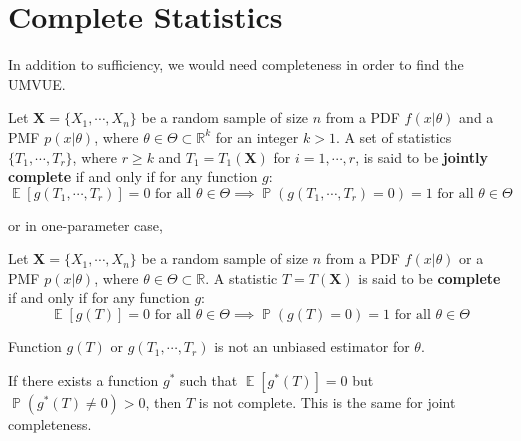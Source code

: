 \documentclass{huhtakm-template-book-v2}
\DeclareMathOperator{\prob}{\mathbb{P}}
\DeclareMathOperator{\E}{\mathbb{E}}
\begin{document}
\section{Complete Statistics}
In addition to sufficiency, we would need completeness in order to find the UMVUE.
\begin{defn}
	Let $\mathbf{X}=\{X_{1},\cdots,X_{n}\}$ be a random sample of size $n$ from a PDF $f(x|\theta)$ and a PMF $p(x|\theta)$, where $\theta\in\Theta\subset\mathbb{R}^{k}$ for an integer $k>1$. A set of statistics $\{T_{1},\cdots,T_{r}\}$, where $r\geq k$ and $T_{1}=T_{1}(\mathbf{X})$ for $i=1,\cdots,r$, is said to be \textbf{jointly complete} if and only if for any function $g$:
	\begin{equation*}
		\E[g(T_{1},\cdots,T_{r})]=0\text{ for all }\theta\in\Theta\implies\prob(g(T_{1},\cdots,T_{r})=0)=1\text{ for all }\theta\in\Theta
	\end{equation*}
\end{defn}
or in one-parameter case,
\begin{defn}
	Let $\mathbf{X}=\{X_{1},\cdots,X_{n}\}$ be a random sample of size $n$ from a PDF $f(x|\theta)$ or a PMF $p(x|\theta)$, where $\theta\in\Theta\subset\mathbb{R}$. A statistic $T=T(\mathbf{X})$ is said to be \textbf{complete} if and only if for any function $g$:
	\begin{equation*}
		\E[g(T)]=0\text{ for all }\theta\in\Theta\implies\prob(g(T)=0)=1\text{ for all }\theta\in\Theta
	\end{equation*} 
\end{defn}
\begin{rem}
	Function $g(T)$ or $g(T_{1},\cdots,T_{r})$ is not an unbiased estimator for $\theta$.
\end{rem}
\begin{rem}
	If there exists a function $g^{*}$ such that $\E[g^{*}(T)]=0$ but $\prob(g^{*}(T)\neq 0)>0$, then $T$ is not complete. This is the same for joint completeness. 
\end{rem}
\end{document}
